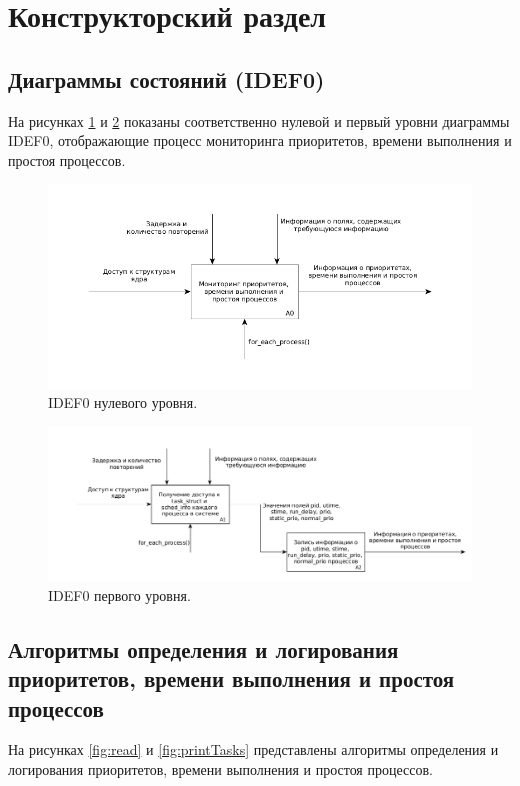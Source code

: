 \section{Конструкторский раздел}

\subsection{Диаграммы состояний (IDEF0)}
На рисунках \ref{fig:idef01} и \ref{fig:idef02} показаны соответственно нулевой и первый уровни диаграммы IDEF0, отображающие процесс мониторинга приоритетов, времени выполнения и простоя процессов.

\begin{figure}[H]
	\centering
	\includegraphics[scale=0.6]{img/idef01.png}
	\caption{IDEF0 нулевого уровня.}
	\label{fig:idef01}
\end{figure}

\begin{figure}[H]
	\centering
	\includegraphics[scale=0.45]{img/idef02.png}
	\caption{IDEF0 первого уровня.}
	\label{fig:idef02}
\end{figure}

\subsection{Алгоритмы определения и логирования приоритетов, времени выполнения и простоя процессов}
На рисунках \ref{fig:read} и \ref{fig:printTasks} представлены алгоритмы определения и логирования приоритетов, времени выполнения и простоя процессов.

